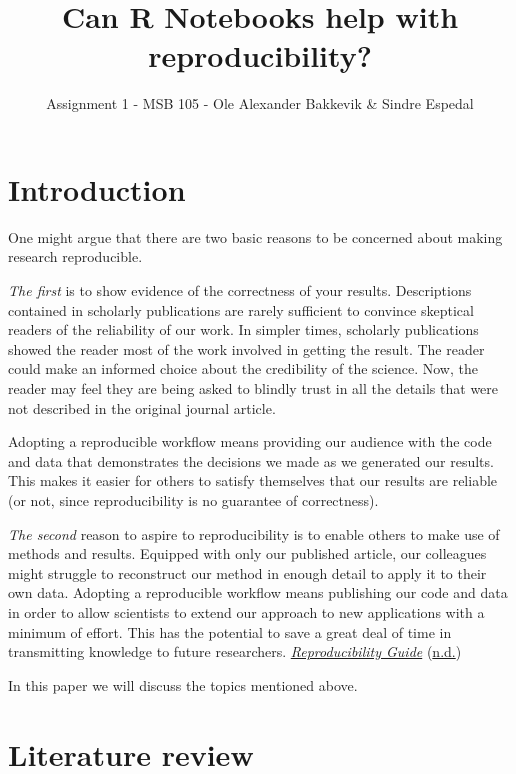 \documentclass[
  11pt,
]{article}
\title{Can R Notebooks help with reproducibility?}
\author{Assignment 1 - MSB 105 - Ole Alexander Bakkevik \& Sindre
Espedal}
\date{}
\begin{document}
\maketitle

\hypertarget{introduction}{%
\section{Introduction}\label{introduction}}

One might argue that there are two basic reasons to be concerned about
making research reproducible.

\emph{The first} is to show evidence of the correctness of your results.
Descriptions contained in scholarly publications are rarely sufficient
to convince skeptical readers of the reliability of our work. In simpler
times, scholarly publications showed the reader most of the work
involved in getting the result. The reader could make an informed choice
about the credibility of the science. Now, the reader may feel they are
being asked to blindly trust in all the details that were not described
in the original journal article.

Adopting a reproducible workflow means providing our audience with the
code and data that demonstrates the decisions we made as we generated
our results. This makes it easier for others to satisfy themselves that
our results are reliable (or not, since reproducibility is no guarantee
of correctness).

\emph{The second} reason to aspire to reproducibility is to enable
others to make use of methods and results. Equipped with only our
published article, our colleagues might struggle to reconstruct our
method in enough detail to apply it to their own data. Adopting a
reproducible workflow means publishing our code and data in order to
allow scientists to extend our approach to new applications with a
minimum of effort. This has the potential to save a great deal of time
in transmitting knowledge to future researchers.
\protect\hyperlink{ref-Git-reproducabilty}{\emph{Reproducibility Guide}}
(\protect\hyperlink{ref-Git-reproducabilty}{n.d.})

In this paper we will discuss the topics mentioned above.

\hypertarget{literature-review}{%
\section{Literature review}\label{literature-review}}
\end{document}
